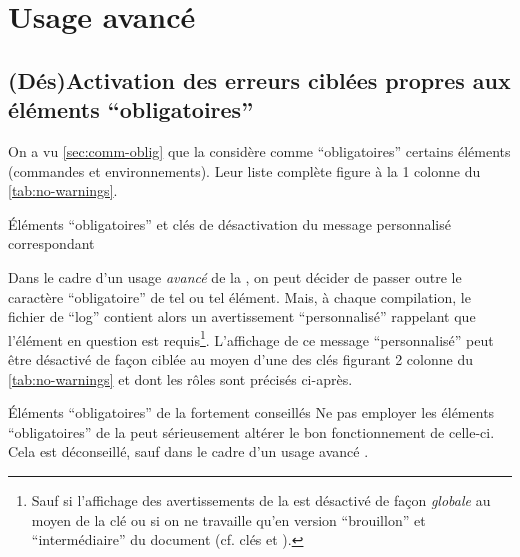 \chapter{Usage avancé}\label{cha:usage-avance}

\section{(Dés)Activation des erreurs ciblées propres aux éléments
  \enquote{obligatoires}}\label{sec:desact-des-erre}

On a vu \vref{sec:comm-oblig} que la \yatcl{} considère comme
\enquote{obligatoires} certains éléments (commandes et environnements). Leur
liste complète figure à la 1\iere{} colonne du \vref{tab:no-warnings}.
\begin{table}[ht]
  \centering
  
  \caption{Éléments \enquote{obligatoires} et clés de désactivation du message
    personnalisé correspondant}
  \label{tab:no-warnings}
\end{table}

Dans le cadre d'un usage \emph{avancé} de la \yatcl{}, on peut décider de
passer outre le caractère \enquote{obligatoire} de tel ou tel élément.  Mais,
à chaque compilation, le fichier de \enquote{log} contient alors un
avertissement \enquote{personnalisé} rappelant que l'élément en question est
requis\footnote{Sauf si l'affichage des avertissements de la \yatcl{} est
  désactivé de façon \emph{globale} au moyen de la clé  ou si
  on ne travaille qu'en version \enquote{brouillon} et \enquote{intermédiaire}
  du document (cf. clés  et ).}.
L'affichage de ce message \enquote{personnalisé} peut être désactivé de façon
ciblée au moyen d'une des clés figurant 2\ieme{} colonne du
\vref{tab:no-warnings} et dont les rôles sont précisés ci-après.

\begin{dbwarning}{Éléments \enquote{obligatoires} de la \yatcl{}
    fortement conseillés}{}
  Ne pas employer les éléments \enquote{obligatoires} de la \yatcl{} peut
  sérieusement altérer le bon fonctionnement de celle-ci. Cela est déconseillé,
  sauf dans le cadre d'un usage avancé .
\end{dbwarning}

